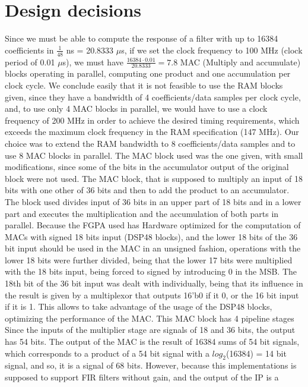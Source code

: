 \documentclass[12pt]{article}
\begin{document}
\section{Design decisions}
Since we must be able to compute the response of a filter with up to 16384 coefficients in
$\frac{1}{48}$ ns = 20.8333 $\mu$s, if we set the clock frequency to 100 MHz (clock period of 0.01
$\mu$s), we must have $\frac{16384\cdot0.01}{20.8333} = 7.8$ MAC (Multiply and accumulate) blocks
operating in parallel, computing one product and one accumulation per clock cycle. We conclude
easily that it is not feasible to use the RAM blocks given, since they have a bandwidth of 4
coefficients/data samples per clock cycle, and, to use only 4 MAC blocks in parallel, we would have
to use a clock frequency of 200 MHz in order to achieve the desired timing requirements, which
exceeds the maximum clock frequency in the RAM specification (147 MHz). Our choice was to extend the
RAM bandwidth to 8 coefficients/data samples and to use 8 MAC blocks in parallel. The MAC block used
was the one given, with small modifications, since some of the bits in the accumulator output of the
original block were not used. The MAC block, that is supposed to multiply an input of 18 bits with
one other of 36 bits and then to add the product to an accumulator. The block used divides input of
36 bits in an upper part of 18 bits and in a lower part and executes the multiplication and the
accumulation of both parts in parallel. Because the FGPA used has Hardware optimized for the
computation of MACs with signed 18 bits input (DSP48 blocks), and the lower 18 bits of the 36 bit
input should be used in the MAC in an unsigned fashion, operations with the lower 18 bits were
further divided, being that the lower 17 bits were multiplied with the 18 bits input, being forced
to signed by introducing 0 in the MSB. The 18th bit of the 36 bit input was dealt with individually,
being that its influence in the result is given by a multiplexor that outputs 16'b0 if it 0, or the
16 bit input if it is 1. This allows to take advantage of the usage of the DSP48 blocks, optimizing
the performance of the MAC. This MAC block has 4 pipeline stages Since the inputs of the multiplier
stage are signals of 18 and 36 bits, the output has 54 bits. The output of the MAC is the result of
16384 sums of 54 bit signals, which corresponds to a product of a 54 bit signal with a
$log_2$(16384) = 14 bit signal, and so, it is a signal of 68 bits. However, because this
implementations is supposed to support FIR filters without gain, and the output of the IP is a
\end{document}
